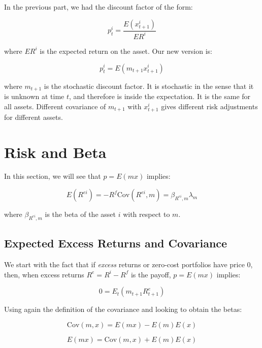 In the previous part, we had the discount factor of the form:

\begin{equation}
    p^i_t = \frac{E(x^i_{t+1})}{ER^i}
\end{equation}

where $ER^i$ is the expected return on the asset.
Our new version is:

\begin{equation}
    p^i_t = E(m_{t+1}x^i_{t+1})
\end{equation}

where $m_{t+1}$ is the stochastic discount factor. It is 
stochastic in the sense that it is unknown at time $t$, 
and therefore is inside the expectation. It is the same 
for all assets. Different covariance of 
$m_{t+1}$ with $x^i_{t+1}$ gives different risk adjustments
for different assets.

\section{Risk and Beta}

In this section, we will see that $p = E(mx)$ implies:

\begin{equation}
E(R^{ei}) = -R^f \text{Cov}(R^{ei}, m) = \beta_{R^{ei},m} \lambda_m
\end{equation}

where $\beta_{R^{ei},m}$ is the beta of the asset $i$ with respect to $m$.

\subsection{Expected Excess Returns and Covariance}

We start with the fact that if \textit{excess} returns or 
zero-cost portfolios have price 0, then, when excess returns 
$R^e = R^i - R^f$
is the payoff, $p = E(mx)$ implies:

\begin{equation}
    0 = E_t(m_{t+1}R^{e}_{t+1})
\end{equation}

Using again the definition of the covariance and looking 
to obtain the betas:

\begin{equation}
    \text{Cov}(m, x) = E(mx) - E(m)E(x)
\end{equation}

\begin{equation}
    E(mx) = \text{Cov}(m, x) + E(m)E(x)
\end{equation}

